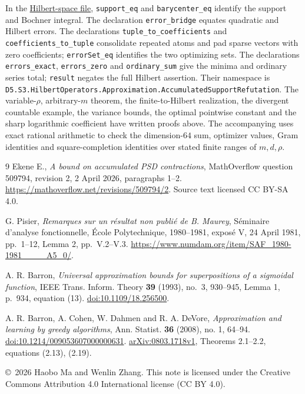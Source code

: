 \documentclass[11pt]{article}
\begin{document}
In the
\href{https://github.com/the-omega-institute/trureturing/blob/88be2a120b67a9d9e724eaae970c8263d0a0e9a4/D5/S3/HilbertOperators/Approximation/AccumulatedSupportRefutation.lean}{Hilbert-space file},
\texttt{support\_eq} and \texttt{barycenter\_eq} identify the support and
Bochner integral. The declaration \texttt{error\_bridge} equates quadratic
and Hilbert errors. The declarations \texttt{tuple\_to\_coefficients} and
\texttt{coefficients\_to\_tuple} consolidate repeated atoms and pad sparse
vectors with zero coefficients; \texttt{errorSet\_eq} identifies the two
optimizing sets.
The declarations \texttt{errors\_exact}, \texttt{errors\_zero} and \texttt{ordinary\_sum}
give the minima and ordinary series total; \texttt{result} negates the
full Hilbert assertion. Their namespace is
\texttt{D5.S3.HilbertOperators.\allowbreak Approximation.\allowbreak AccumulatedSupportRefutation}.
The variable-$\rho$, arbitrary-$m$ theorem, the finite-to-Hilbert
realization, the divergent countable example, the variance bounds,
the optimal pointwise constant and
the sharp logarithmic coefficient have written proofs above.
The accompanying  uses exact rational arithmetic to check
the dimension-$64$ sum, optimizer values, Gram identities and
square-completion identities over stated finite ranges of $m,d,\rho$.

\begin{thebibliography}{9}
Ekene E., \emph{A bound on accumulated PSD contractions},
MathOverflow question 509794, revision 2, 2 April 2026, paragraphs 1--2.
\url{https://mathoverflow.net/revisions/509794/2}.
Source text licensed CC BY-SA 4.0.

G. Pisier, \emph{Remarques sur un r\'esultat non publi\'e de B. Maurey},
S\'eminaire d'analyse fonctionnelle, \'Ecole Polytechnique, 1980--1981,
expos\'e V, 24 April 1981, pp.~1--12, Lemma 2, pp.~V.2--V.3.
\url{https://www.numdam.org/item/SAF_1980-1981____A5_0/}.

A. R. Barron, \emph{Universal approximation bounds for superpositions of
a sigmoidal function}, IEEE Trans. Inform. Theory \textbf{39} (1993),
no.~3, 930--945, Lemma 1, p.~934, equation (13).
\href{https://doi.org/10.1109/18.256500}{doi:10.1109/18.256500}.

A. R. Barron, A. Cohen, W. Dahmen and R. A. DeVore,
\emph{Approximation and learning by greedy algorithms},
Ann. Statist. \textbf{36} (2008), no. 1, 64--94.
\href{https://doi.org/10.1214/009053607000000631}{doi:10.1214/009053607000000631}.
\href{https://arxiv.org/abs/0803.1718v1}{arXiv:0803.1718v1},
Theorems 2.1--2.2, equations (2.13), (2.19).
\end{thebibliography}

\medskip
\noindent\small\copyright\ 2026 Haobo Ma and Wenlin Zhang.
This note is licensed under the Creative Commons Attribution 4.0
International license (CC BY 4.0).
\end{document}
